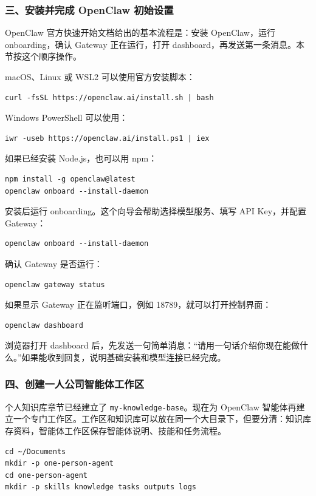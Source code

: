 \subsubsection*{三、安装并完成 OpenClaw 初始设置}

OpenClaw 官方快速开始文档给出的基本流程是：安装 OpenClaw，运行 onboarding，确认 Gateway 正在运行，打开 dashboard，再发送第一条消息。本节按这个顺序操作。

macOS、Linux 或 WSL2 可以使用官方安装脚本：
\begin{verbatim}
curl -fsSL https://openclaw.ai/install.sh | bash
\end{verbatim}

Windows PowerShell 可以使用：
\begin{verbatim}
iwr -useb https://openclaw.ai/install.ps1 | iex
\end{verbatim}

如果已经安装 Node.js，也可以用 npm：
\begin{verbatim}
npm install -g openclaw@latest
openclaw onboard --install-daemon
\end{verbatim}

安装后运行 onboarding。这个向导会帮助选择模型服务、填写 API Key，并配置 Gateway：
\begin{verbatim}
openclaw onboard --install-daemon
\end{verbatim}

确认 Gateway 是否运行：
\begin{verbatim}
openclaw gateway status
\end{verbatim}

如果显示 Gateway 正在监听端口，例如 18789，就可以打开控制界面：
\begin{verbatim}
openclaw dashboard
\end{verbatim}

浏览器打开 dashboard 后，先发送一句简单消息：“请用一句话介绍你现在能做什么。”如果能收到回复，说明基础安装和模型连接已经完成。

\subsubsection*{四、创建一人公司智能体工作区}

个人知识库章节已经建立了 \texttt{my-knowledge-base}。现在为 OpenClaw 智能体再建立一个专门工作区。工作区和知识库可以放在同一个大目录下，但要分清：知识库存资料，智能体工作区保存智能体说明、技能和任务流程。

\begin{verbatim}
cd ~/Documents
mkdir -p one-person-agent
cd one-person-agent
mkdir -p skills knowledge tasks outputs logs
\end{verbatim}

